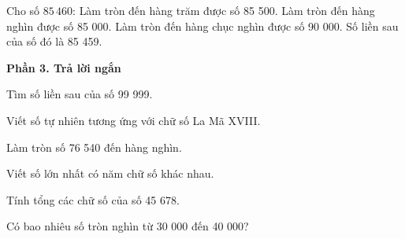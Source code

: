 \begin{ex} %
Cho số $85\,460$:
\choiceTF
{\True Làm tròn đến hàng trăm được số 85 500.}
{\True Làm tròn đến hàng nghìn được số 85 000.}
{\True Làm tròn đến hàng chục nghìn được số 90 000.}
{Số liền sau của số đó là 85 459.}
\end{ex}

\textbf{Phần 3. Trả lời ngắn}

\begin{ex} %
Tìm số liền sau của số 99 999.
\end{ex}

\begin{ex} %
Viết số tự nhiên tương ứng với chữ số La Mã XVIII.
\end{ex}

\begin{ex} %
Làm tròn số 76 540 đến hàng nghìn.
\end{ex}

\begin{ex} %
Viết số lớn nhất có năm chữ số khác nhau.
\end{ex}

\begin{ex} %
Tính tổng các chữ số của số 45 678.
\end{ex}

\begin{ex} %
Có bao nhiêu số tròn nghìn từ 30 000 đến 40 000?
\end{ex}
